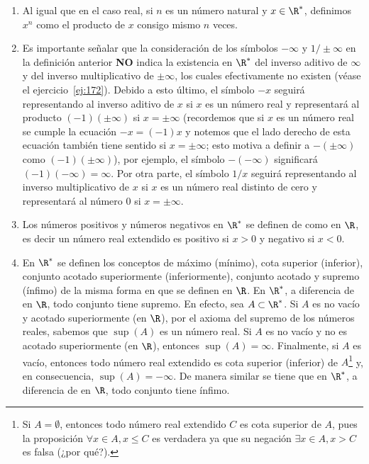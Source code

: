 \documentclass[12pt,a4paper]{book}
\begin{document}
\begin{observacion}
\begin{enumerate}[label=\arabic*.]
            involucradas estuvieran definidas), pues en caso contrario tendríamos, por
            ejemplo, que $0=\infty-\infty=(\infty+\infty)-\infty=\infty+(\infty-\infty)=\infty+0=\infty$,
            lo cual sería una contradicción.
            \item Al igual que en el caso real, si $n$ es un número natural y $x\in\R^{*}$, definimos
            $x^{n}$ como el producto de $x$ consigo mismo $n$ veces.
            \item Es importante señalar que la consideración de los símbolos $-\infty$ y $1/\pm\infty$
            en la definición anterior \textbf{NO} indica la existencia en $\R^{*}$ del inverso aditivo
            de $\infty$ y del inverso multiplicativo de $\pm\infty$, los cuales efectivamente no
            existen (véase el ejercicio~\ref{ej:172}). Debido a esto último, el símbolo $-x$ seguirá
            representando al inverso aditivo de $x$ si $x$ es un número real y representará
            al producto $(-1)(\pm\infty)$ si $x=\pm\infty$ (recordemos que si $x$ es un número
            real se cumple la ecuación $-x=(-1)x$ y notemos que el lado derecho
            de esta ecuación también tiene sentido si $x=\pm\infty$; esto motiva a definir
            a $-(\pm\infty)$ como $(-1)(\pm\infty)$), por ejemplo, el símbolo $-(-\infty)$ significará
            $(-1)(-\infty)=\infty$. Por otra parte, el símbolo $1/x$ seguirá representando
            al inverso multiplicativo de $x$ si $x$ es un número real distinto de cero y
            representará al número $0$ si $x=\pm\infty$.
            \item Los números positivos y números negativos en $\R^{*}$ se definen de como en
            $\R$, es decir un número real extendido es positivo si $x>0$ y negativo si
            $x<0$.
            \item En $\R^{*}$ se definen los conceptos de máximo (mínimo), cota superior (inferior),
            conjunto acotado superiormente (inferiormente), conjunto acotado
            y supremo (ínfimo) de la misma forma en que se definen en $\R$. En $\R^{*}$, a
            diferencia de en $\R$, todo conjunto tiene supremo. En efecto, sea $A\subset\R^{*}$. Si
            $A$ es no vacío y acotado superiormente (en $\R$), por el axioma del supremo
            de los números reales, sabemos que $\sup(A)$ es un número real. Si $A$ es no
            vacío y no es acotado superiormente (en $\R$), entonces $\sup(A)=\infty$. Finalmente,
            si $A$ es vacío, entonces todo número real extendido es cota superior
            (inferior) de $A$\footnote{Si $A=\emptyset$, entonces todo número real extendido $C$ es cota superior de $A$, pues la
            proposición $\forall x\in A,x\leq C$ es verdadera ya que su negación $\exists x\in A,x>C$ es falsa (¿por
            qué?).} y, en consecuencia, $\sup(A)=-\infty$. De manera similar se
            tiene que en $\R^{*}$, a diferencia de en $\R$, todo conjunto tiene ínfimo.
        \end{enumerate}
    \end{observacion}
\end{document}
